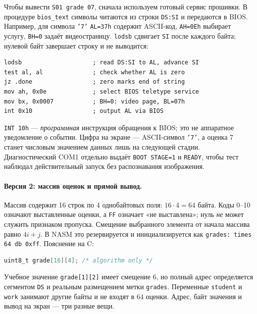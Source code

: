 Чтобы вывести \texttt{S01  grade 07}, сначала используем готовый сервис
прошивки. В процедуре \texttt{bios\_text} символы читаются из строки
\texttt{DS:SI} и передаются в BIOS. Например, для символа \texttt{'7'}
\texttt{AL=37h} содержит ASCII-код, \texttt{AH=0Eh} выбирает услугу,
\texttt{BH=0} задаёт видеостраницу. \texttt{lodsb} сдвигает \texttt{SI}
после каждого байта; нулевой байт завершает строку и не выводится:
\begin{lstlisting}[basicstyle=\ttfamily\small]
lodsb                    ; read DS:SI to AL, advance SI
test al, al              ; check whether AL is zero
jz .done                 ; zero marks end of string
mov ah, 0x0e             ; select BIOS teletype service
mov bx, 0x0007           ; BH=0: video page, BL=07h
int 0x10                 ; output AL via BIOS
\end{lstlisting}
\texttt{INT 10h} --- \emph{программная} инструкция обращения к BIOS;
это не аппаратное уведомление о событии. Цифра на экране --- ASCII-символ
\texttt{'7'}, а оценка 7 станет числовым значением данных лишь на следующей
стадии. Диагностический COM1 отдельно выдаёт \texttt{BOOT STAGE=1} и
\texttt{READY}, чтобы тест наблюдал действительный запуск без распознавания
изображения.

\paragraph{Версия 2: массив оценок и прямой вывод.}
Массив содержит 16 строк по 4 однобайтовых поля: $16\cdot4=64$ байта.
Коды 0--10 означают выставленные оценки, а \texttt{FF} означает
«не выставлена»; нуль \emph{не} может служить признаком пропуска.
Смещение выбранного элемента от начала массива равно $4i+j$.
В NASM это резервируется и инициализируется как
\texttt{grades: times 64 db 0xff}. Пояснение на C:
\begin{lstlisting}[language=C,basicstyle=\ttfamily\small]
uint8_t grade[16][4]; /* algorithm only */
\end{lstlisting}
Учебное значение \texttt{grade[1][2]} имеет смещение 6, но полный адрес
определяется сегментом \texttt{DS} и реальным размещением метки
\texttt{grades}. Переменные \texttt{student} и \texttt{work} занимают
другие байты и не входят в 64 оценки. Адрес, байт значения и вывод
на экран --- три разные вещи.

